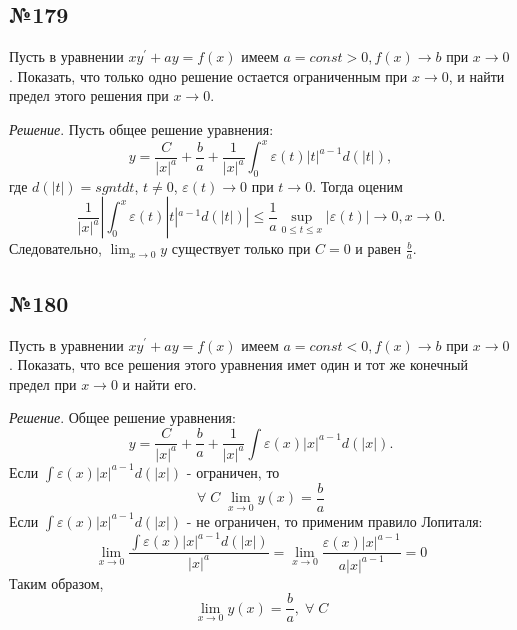 \documentclass[11pt, a4paper]{article}
\begin{document}
	
	\subsection*{№179}
	\par
	Пусть в уравнении $xy^\prime+ay=f(x)$ имеем $a=const>0, f(x) \longrightarrow b$ при $x \longrightarrow 0$. Показать, что только одно решение остается ограниченным при $x \longrightarrow 0$, и найти предел этого решения при $x \longrightarrow 0$.
	\vspace{0.2cm}
	\par
	\textit{Решение}. Пусть общее решение уравнения:
	$$y=\frac{C}{|x|^{a}}+\frac{b}{a}+\frac{1}{|x|^{a}}\int_0^x \varepsilon (t)|t|^{a-1}d(|t|),$$
	где $d(|t|)=sgntdt$, $t \neq 0$, $ \varepsilon (t) \longrightarrow 0$ при $t \longrightarrow 0$. Тогда оценим 
	$$\frac{1}{|x|^{a}}|\int_0^x \varepsilon (t)|t|^{a-1}d(|t|)| \leq \frac{1}{a} \sup_{0 \leq t \leq x} |\varepsilon (t)| \longrightarrow 0, x \longrightarrow 0.$$
	Следовательно, $\lim_{x \to 0}y$ существует только при $C=0$ и равен $\frac{b}{a}$. 
	
	
	\subsection*{№180}
	\par
	Пусть в уравнении $xy^\prime+ay=f(x)$ имеем $a=const<0, f(x) \longrightarrow b$ при $x \longrightarrow 0$. Показать, что все решения этого уравнения имет один и тот же конечный предел при $x \longrightarrow 0$ и найти его.
	\vspace{0.2cm}
	\par
	\textit{Решение}. Общее решение уравнения:
	$$y=\frac{C}{|x|^{a}}+\frac{b}{a}+\frac{1}{|x|^{a}}\int \varepsilon (x)|x|^{a-1}d(|x|).$$
	Если $\int \varepsilon(x)|x|^{a-1}d(|x|)$ - ограничен, то
	$$\forall \; C \; \lim_{x\to 0}  y(x) = \frac{b}{a}$$
	Если $\int \varepsilon(x)|x|^{a-1}d(|x|)$ - не ограничен, то применим правило Лопиталя:
	$$\lim_{x \to 0} \frac{\int \varepsilon (x)|x|^{a-1}d(|x|)}{|x|^a} = \lim_{x \to 0} \frac{\varepsilon (x)|x|^{a-1}}{a|x|^{a-1}} = 0$$
	Таким образом,
	$$\lim_{x\to 0} y(x) = \frac{b}{a}, \; \forall \; C$$ 
	
	
\end{document}
